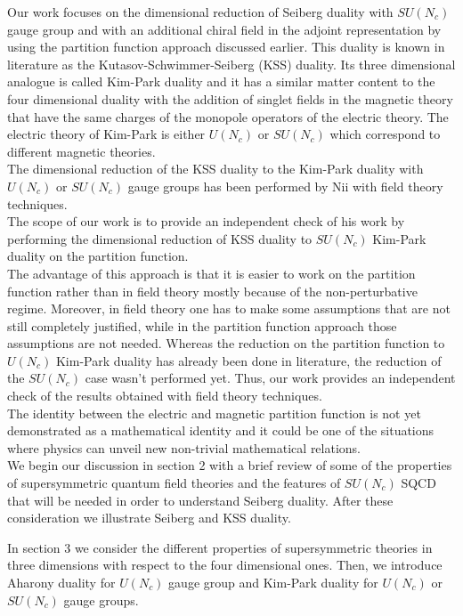Our work focuses on the dimensional reduction of Seiberg duality with $SU(N_c)$ gauge group and with an additional chiral field in the adjoint representation by using the partition function approach discussed earlier.
This duality is known in literature as the Kutasov-Schwimmer-Seiberg (KSS) duality.
Its three dimensional analogue is called Kim-Park duality and it has a similar matter content to the four dimensional duality with the addition of singlet fields in the magnetic theory that have the same charges of the monopole operators of the electric theory.
The electric theory of Kim-Park is either $U(N_c)$ or $SU(N_c)$ which correspond to different magnetic theories. 
 \\
The dimensional reduction of the KSS duality to the Kim-Park duality with $U(N_c)$ or $SU(N_c)$ gauge groups has been performed by Nii with field theory techniques.\\
The scope of our work is to provide an independent check of his work by performing the dimensional reduction of KSS duality to $SU(N_c)$ Kim-Park duality on the partition function.\\
The advantage of this approach is that it is easier to work on the partition function rather than in field theory mostly because of the non-perturbative regime.
Moreover, in field theory one has to make some assumptions that are not still completely justified, while in the partition function approach those assumptions are not needed.
Whereas the reduction on the partition function to $U(N_c)$ Kim-Park duality has already been done in literature, the reduction of the $SU(N_c)$ case wasn't performed yet.
Thus, our work provides an independent check of the results obtained with field theory techniques.\\
The identity between the electric and magnetic partition function is not yet demonstrated as a mathematical identity and it could be one of the situations where physics can unveil new non-trivial mathematical relations. 
\\

\pagestyle{intro}
We begin our discussion in section 2 with a brief review of some of the properties of supersymmetric quantum field theories and the features of $SU(N_c)$ SQCD that will be needed in order to understand Seiberg duality.
After these consideration we illustrate Seiberg and KSS duality.
\thispagestyle{intro}

In section 3 we consider the different properties of supersymmetric theories in three dimensions with respect to the four dimensional ones.
Then, we introduce Aharony duality for $U(N_c)$ gauge group and Kim-Park duality for $U(N_c)$ or $SU(N_c)$ gauge groups.

